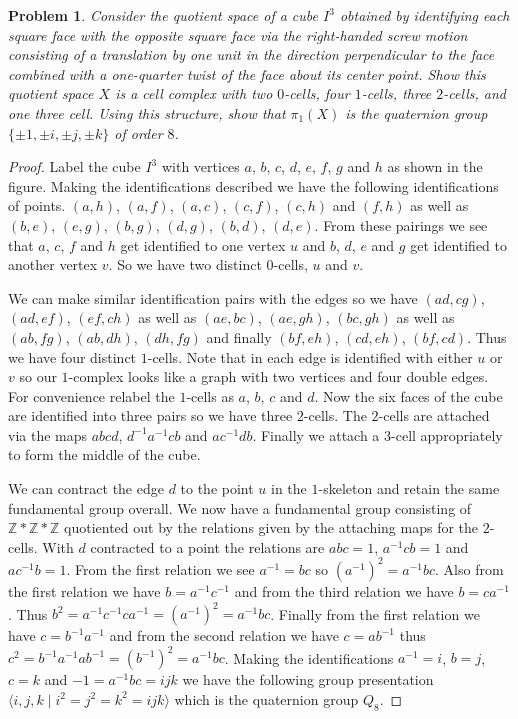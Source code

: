 \documentclass{article}
\newtheorem{problem}{Problem}
\begin{document}
\begin{problem}
Consider the quotient space of a cube $I^3$ obtained by identifying each square face with the opposite square face via the right-handed screw motion consisting of a translation by one unit in the direction perpendicular to the face combined with a one-quarter twist of the face about its center point. Show this quotient space $X$ is a cell complex with two $0$-cells, four $1$-cells, three $2$-cells, and one three cell. Using this structure, show that $\pi_1(X)$ is the quaternion group $\{\pm 1, \pm i, \pm j, \pm k\}$ of order $8$.
\end{problem}
\begin{proof}
Label the cube $I^3$ with vertices $a$, $b$, $c$, $d$, $e$, $f$, $g$ and $h$ as shown in the figure. Making the identifications described we have the following identifications of points. $(a,h)$, $(a,f)$, $(a,c)$, $(c,f)$, $(c,h)$ and $(f,h)$ as well as $(b,e)$, $(e,g)$, $(b,g)$, $(d,g)$, $(b,d)$, $(d,e)$. From these pairings we see that $a$, $c$, $f$ and $h$ get identified to one vertex $u$ and $b$, $d$, $e$ and $g$ get identified to another vertex $v$. So we have two distinct $0$-cells, $u$ and $v$.
\vspace{100pt}

We can make similar identification pairs with the edges so we have $(ad,cg)$, $(ad,ef)$, $(ef,ch)$ as well as $(ae,bc)$, $(ae,gh)$, $(bc,gh)$ as well as $(ab,fg)$, $(ab,dh)$, $(dh,fg)$ and finally $(bf,eh)$, $(cd,eh)$, $(bf,cd)$. Thus we have four distinct $1$-cells. Note that in each edge is identified with either $u$ or $v$ so our $1$-complex looks like a graph with two vertices and four double edges. For convenience relabel the $1$-cells as $a$, $b$, $c$ and $d$.
\vspace{100pt}
Now the six faces of the cube are identified into three pairs so we have three $2$-cells. The $2$-cells are attached via the maps $abcd$, $d^{-1}a^{-1}cb$ and $ac^{-1}db$. Finally we attach a $3$-cell appropriately to form the middle of the cube.

We can contract the edge $d$ to the point $u$ in the $1$-skeleton and retain the same fundamental group overall. We now have a fundamental group consisting of $\mathbb{Z} * \mathbb{Z} * \mathbb{Z}$ quotiented out by the relations given by the attaching maps for the $2$-cells. With $d$ contracted to a point the relations are $abc = 1$, $a^{-1}cb = 1$ and $ac^{-1}b = 1$. From the first relation we see $a^{-1} = bc$ so $(a^{-1})^2 = a^{-1}bc$. Also from the first relation we have $b = a^{-1}c^{-1}$ and from the third relation we have $b = ca^{-1}$. Thus $b^2 = a^{-1}c^{-1}ca^{-1} = (a^{-1})^2 = a^{-1}bc$. Finally from the first relation we have $c = b^{-1}a^{-1}$ and from the second relation we have $c = ab^{-1}$ thus $c^2 = b^{-1}a^{-1}ab^{-1} = (b^{-1})^2 = a^{-1}bc$. Making the identifications $a^{-1} = i$, $b = j$, $c = k$ and $-1 = a^{-1}bc = ijk$ we have the following group presentation $\langle i, j , k \mid i^2 = j^2 = k^2 = ijk \rangle$ which is the quaternion group $Q_8$.
\end{proof}
\end{document}
